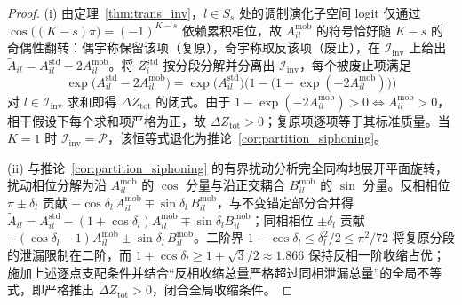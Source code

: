 \documentclass[11pt,a4paper]{article}
\theoremstyle{definition}
\begin{document}
\begin{proof}
(i) 由定理~\ref{thm:trans_inv}，$l \in S_s$ 处的调制演化子空间 logit 仅通过 $\cos\big((K-s)\pi\big) = (-1)^{K-s}$ 依赖累积相位，故 $A_{il}^{\text{mob}}$ 的符号恰好随 $K - s$ 的奇偶性翻转：偶宇称保留该项（复原），奇宇称取反该项（废止），在 $\mathcal{I}_{\text{inv}}$ 上给出 $\tilde{A}_{il} = A_{il}^{\text{std}} - 2A_{il}^{\text{mob}}$。将 $Z_i^{\mathrm{std}}$ 按分段分解并分离出 $\mathcal{I}_{\text{inv}}$，每个被废止项满足
\begin{equation}
\exp\big(A_{il}^{\text{std}} - 2A_{il}^{\text{mob}}\big) = \exp\big(A_{il}^{\text{std}}\big)\Big(1 - \big(1 - \exp(-2A_{il}^{\text{mob}})\big)\Big)
\end{equation}
对 $l \in \mathcal{I}_{\text{inv}}$ 求和即得 $\Delta Z_{\text{tot}}$ 的闭式。由于 $1 - \exp(-2A_{il}^{\text{mob}}) > 0 \iff A_{il}^{\text{mob}} > 0$，相干假设下每个求和项严格为正，故 $\Delta Z_{\text{tot}} > 0$；复原项逐项等于其标准质量。当 $K = 1$ 时 $\mathcal{I}_{\text{inv}} = \mathcal{P}$，该恒等式退化为推论~\ref{cor:partition_siphoning}。

(ii) 与推论~\ref{cor:partition_siphoning} 的有界扰动分析完全同构地展开平面旋转，扰动相位分解为沿 $A_{il}^{\text{mob}}$ 的 $\cos$ 分量与沿正交耦合 $B_{il}^{\text{mob}}$ 的 $\sin$ 分量。反相相位 $\pi \pm \delta_l$ 贡献 $-\cos\delta_l\, A_{il}^{\text{mob}} \mp \sin\delta_l\, B_{il}^{\text{mob}}$，与不变锚定部分合并得 $\tilde{A}_{il} = A_{il}^{\text{std}} - (1 + \cos\delta_l)A_{il}^{\text{mob}} \mp \sin\delta_l B_{il}^{\text{mob}}$；同相相位 $\pm \delta_l$ 贡献 $+(\cos\delta_l - 1)A_{il}^{\text{mob}} \pm \sin\delta_l\, B_{il}^{\text{mob}}$。二阶界 $1 - \cos\delta_l \le \delta_l^2/2 \le \pi^2/72$ 将复原分段的泄漏限制在二阶，而 $1 + \cos\delta_l \ge 1 + \sqrt{3}/2 \approx 1.866$ 保持反相一阶收缩占优；施加上述逐点支配条件并结合“反相收缩总量严格超过同相泄漏总量”的全局不等式，即严格推出 $\Delta Z_{\text{tot}} > 0$，闭合全局收缩条件。
\end{proof}
\end{document}
